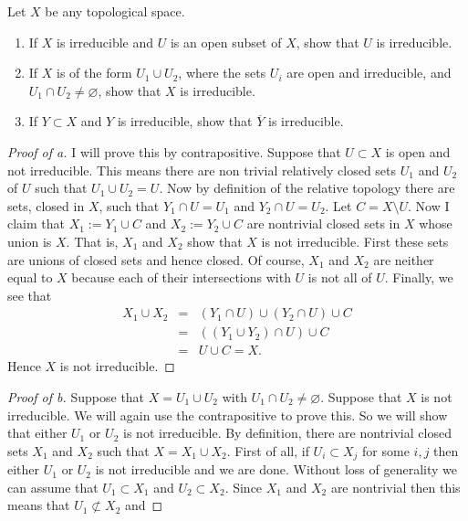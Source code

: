 \documentclass{article}
\begin{document}
\begin{problem}
  Let $X$ be any topological space.
  \begin{enumerate}
    \item[a] If $X$ is irreducible and $U$ is an open subset of $X$, show
      that $U$ is irreducible.
    \item [b] If $X$ is of the form $U_1\cup U_2$, where the sets $U_i$ are
      open and irreducible, and $U_1\cap U_2\ne\varnothing$, show that $X$
      is irreducible.
    \item [c] If $Y\subset X$ and $Y$ is irreducible, show that
      $\overline{Y}$ is irreducible. 
  \end{enumerate}
  \begin{proof}[Proof of a]
    I will prove this by contrapositive.
    Suppose that $U\subset X$ is open and not irreducible. This means there
    are non trivial relatively closed sets $U_1$ and $U_2$ of $U$ such that
    $U_1\cup U_2 = U$. Now by definition of the relative topology there are
    sets, closed in $X$, such that $Y_1\cap U=U_1$ and $Y_2\cap U=U_2$. Let
    $C=X\setminus U$. Now I claim that $X_1:= Y_1\cup C$ and $X_2:=Y_2\cup
    C$ are nontrivial closed sets in $X$ whose union is $X$. That is, $X_1$
    and $X_2$ show that $X$ is not irreducible. First these sets are unions
    of closed sets and hence closed. Of course, $X_1$ and
    $X_2$ are neither equal to $X$ because each of their intersections 
    with $U$ is not all of $U$. Finally, we see that
    \begin{eqnarray*}
      X_1\cup X_2&=& (Y_1\cap U)\cup (Y_2\cap U)\cup C\\
      &=& ((Y_1\cup Y_2)\cap U)\cup C\\
      &=& U\cup C = X.
    \end{eqnarray*}
    Hence $X$ is not irreducible.
  \end{proof}
  \begin{proof}[Proof of b]
    Suppose that $X=U_1\cup U_2$ with $U_1\cap U_2\ne\varnothing$. Suppose
    that $X$ is not irreducible.
    We will again use the contrapositive to prove this. So we will show
    that either $U_1$ or $U_2$ is not irreducible.
    By definition, there are nontrivial closed
    sets $X_1$ and $X_2$ such that $X=X_1\cup X_2$. First of all, if
    $U_i\subset X_j$ for some $i,j$ then either $U_1$ or $U_2$ is not irreducible
    and we are done. Without loss of generality we can
    assume that $U_1\subset X_1$ and $U_2\subset X_2$. Since $X_1$ and
    $X_2$ are nontrivial then this means that $U_1\not\subset X_2$ and

\end{proof}
\end{problem}
\end{document}
